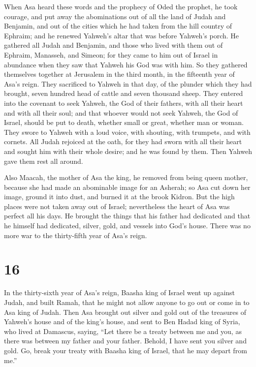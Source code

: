  When Asa heard these words and the prophecy of Oded the
prophet, he took courage, and put away the abominations out of all the
land of Judah and Benjamin, and out of the cities which he had taken
from the hill country of Ephraim; and he renewed Yahweh's altar that was
before Yahweh's porch.  He gathered all Judah and
Benjamin, and those who lived with them out of Ephraim, Manasseh, and
Simeon; for they came to him out of Israel in abundance when they saw
that Yahweh his God was with him.  So they gathered
themselves together at Jerusalem in the third month, in the fifteenth
year of Asa's reign.  They sacrificed to Yahweh in that
day, of the plunder which they had brought, seven hundred head of cattle
and seven thousand sheep.  They entered into the covenant
to seek Yahweh, the God of their fathers, with all their heart and with
all their soul;  and that whoever would not seek Yahweh,
the God of Israel, should be put to death, whether small or great,
whether man or woman.  They swore to Yahweh with a loud
voice, with shouting, with trumpets, and with cornets. 
All Judah rejoiced at the oath, for they had sworn with all their heart
and sought him with their whole desire; and he was found by them. Then
Yahweh gave them rest all around.

 Also Maacah, the mother of Asa the king, he removed from
being queen mother, because she had made an abominable image for an
Asherah; so Asa cut down her image, ground it into dust, and burned it
at the brook Kidron.  But the high places were not taken
away out of Israel; nevertheless the heart of Asa was perfect all his
days.  He brought the things that his father had
dedicated and that he himself had dedicated, silver, gold, and vessels
into God's house.  There was no more war to the
thirty-fifth year of Asa's reign.

\hypertarget{section-15}{%
\section{16}\label{section-15}}

 In the thirty-sixth year of Asa's reign, Baasha king of
Israel went up against Judah, and built Ramah, that he might not allow
anyone to go out or come in to Asa king of Judah.  Then
Asa brought out silver and gold out of the treasures of Yahweh's house
and of the king's house, and sent to Ben Hadad king of Syria, who lived
at Damascus, saying,  ``Let there be a treaty between me
and you, as there was between my father and your father. Behold, I have
sent you silver and gold. Go, break your treaty with Baasha king of
Israel, that he may depart from me.''

